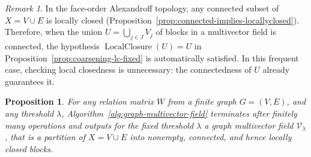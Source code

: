 \documentclass{article}
\theoremstyle{definition}
\theoremstyle{plain}
\newtheorem{proposition}{Proposition}
\theoremstyle{remark}
\newtheorem{remark}{Remark}
\newcommand{\1}{\mathbbm{1}}  %
\begin{document}
\begin{remark} 
\label{rem:connected-union-locallyclosed}
In the face-order Alexandroff topology, any connected subset of
$X=V\cup E$ is locally closed
(Proposition~\ref{prop:connected-implies-locallyclosed}).
Therefore, when the union
$U=\bigcup_{j\in J}V_j$ of blocks in a multivector field is connected,
the hypothesis $\operatorname{LocalClosure}(U)=U$ in
Proposition~\ref{prop:coarsening-lc-fixed} is automatically satisfied.
In this frequent case, checking local closedness is unnecessary:
the connectedness of $U$ already guarantees it.
\end{remark}

\begin{proposition} 
\label{prop:termination-lc-final}
For any relation matrix $W$ from a finite graph \(G=(V,E)\), and any threshold \(\lambda\), 
Algorithm~\ref{alg:graph-multivector-field} terminates after finitely many
operations and outputs for the fixed threshold $\lambda$ a graph multivector field
\(\mathcal V_\lambda\), that is a partition of \(X = V \cup E\) into
nonempty, connected, and hence locally closed blocks.
\end{proposition}
\end{document}
